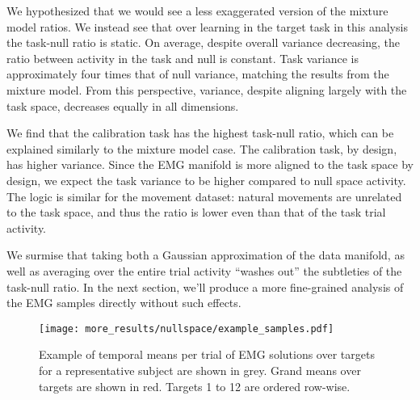 \documentclass[../main.tex]{subfiles}
\begin{document}
  We hypothesized that we would see a less exaggerated version of the mixture model ratios. We instead see that over learning in the target task in this analysis the task-null ratio is static. On average, despite overall variance decreasing, the ratio between activity in the task and null is constant. Task variance is approximately four times that of null variance, matching the results from the mixture model. From this perspective, variance, despite aligning largely with the task space, decreases equally in all dimensions.
  
  We find that the calibration task has the highest task-null ratio, which can be explained similarly to the mixture model case. The calibration task, by design, has higher variance. Since the EMG manifold is more aligned to the task space by design, we expect the task variance to be higher compared to null space activity. The logic is similar for the movement dataset: natural movements are unrelated to the task space, and thus the ratio is lower even than that of the task trial activity.
  
  We surmise that taking both a Gaussian approximation of the data manifold, as well as averaging over the entire trial activity ``washes out'' the subtleties of the task-null ratio. In the next section, we'll produce a more fine-grained analysis of the EMG samples directly without such effects.


  
  \begin{figure}[H]%
    \centering
    \texttt{[image: more\_results/nullspace/example\_samples.pdf]}
    \caption[Example of mean EMG solutions for one subject]{Example of temporal means per trial of EMG solutions over targets for a representative subject are shown in grey. Grand means over targets are shown in red. Targets 1 to 12 are ordered row-wise.}\label{fig:example_samples}
  \end{figure}
  
\end{document}
